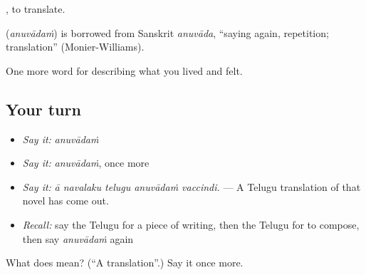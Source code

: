  , to translate.

\begin{cousinweb}
\textbf{} (\emph{anuvādaṁ}) is borrowed from Sanskrit \emph{anuvāda}, \textquotedblleft{}saying again, repetition; translation\textquotedblright{} (Monier-Williams).
\end{cousinweb}

\begin{grammarlens}[title={What you've built}]
One more word for describing what you lived and felt.
\end{grammarlens}

\subsection*{Your turn}
\begin{itemize}
\raggedright
  \item \emph{Say it:} \emph{anuvādaṁ}
  \item \emph{Say it:} \emph{anuvādaṁ}, once more
  \item \emph{Say it:} \emph{ā navalaku telugu anuvādaṁ vaccindi.} — A Telugu translation of that novel has come out.
  \item \emph{Recall:} say the Telugu for a piece of writing, then the Telugu for to compose, then say \emph{anuvādaṁ} again
\end{itemize}

\begin{tcolorbox}[breakable,colback=teal!4,colframe=teal!35!black,title={Before you move on}]
What does  mean? (\textquotedblleft{}A translation\textquotedblright{}.) Say it once more.
\end{tcolorbox}
